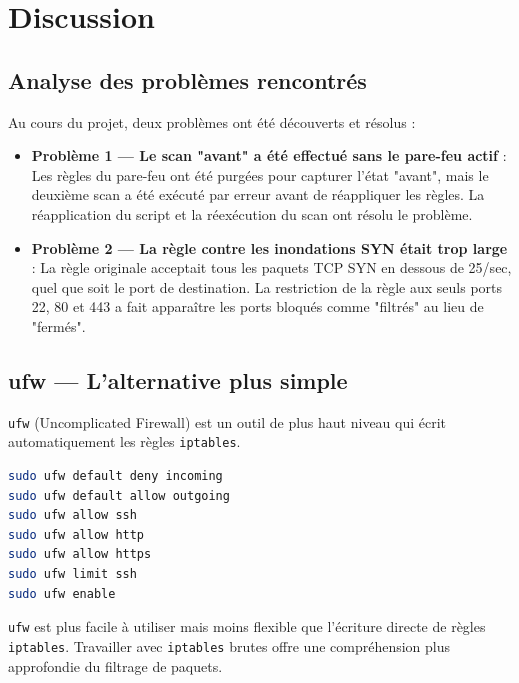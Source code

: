 \chapter{Discussion}
\section{Analyse des problèmes rencontrés}
Au cours du projet, deux problèmes ont été découverts et résolus :
\begin{itemize}
    \item \textbf{Problème 1 — Le scan "avant" a été effectué sans le pare-feu actif} : Les règles du pare-feu ont été purgées pour capturer l'état "avant", mais le deuxième scan a été exécuté par erreur avant de réappliquer les règles. La réapplication du script et la réexécution du scan ont résolu le problème.
    \item \textbf{Problème 2 — La règle contre les inondations SYN était trop large} : La règle originale acceptait tous les paquets TCP SYN en dessous de 25/sec, quel que soit le port de destination. La restriction de la règle aux seuls ports 22, 80 et 443 a fait apparaître les ports bloqués comme "filtrés" au lieu de "fermés".
\end{itemize}

\section{ufw — L'alternative plus simple}
\texttt{ufw} (Uncomplicated Firewall) est un outil de plus haut niveau qui écrit automatiquement les règles \texttt{iptables}.
\begin{lstlisting}[language=bash]
sudo ufw default deny incoming
sudo ufw default allow outgoing
sudo ufw allow ssh
sudo ufw allow http
sudo ufw allow https
sudo ufw limit ssh
sudo ufw enable
\end{lstlisting}
\texttt{ufw} est plus facile à utiliser mais moins flexible que l'écriture directe de règles \texttt{iptables}. Travailler avec \texttt{iptables} brutes offre une compréhension plus approfondie du filtrage de paquets.
\lipsum[9-10]
